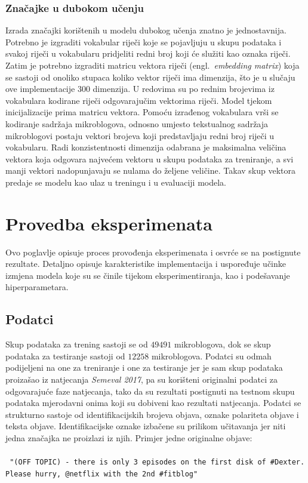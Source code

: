 \documentclass[times, utf8, zavrsni]{fer}
\begin{document}
\subsection{Značajke u dubokom učenju}

Izrada značajki korištenih u modelu dubokog učenja znatno je jednostavnija. Potrebno je izgraditi vokabular riječi koje se pojavljuju u skupu podataka i svakoj riječi u vokabularu pridjeliti redni broj koji će služiti kao oznaka riječi. Zatim je potrebno izgraditi matricu vektora riječi (engl.~\emph{embedding matrix}) koja se sastoji od onoliko stupaca koliko vektor riječi ima dimenzija, što je u slučaju ove implementacije 300 dimenzija. U redovima su po rednim brojevima iz vokabulara kodirane riječi odgovarajučim vektorima riječi. Model tjekom inicijalizacije prima matricu vektora. Pomoću izrađenog vokabulara vrši se kodiranje sadržaja mikroblogova, odnosno umjesto tekstualnog sadržaja mikroblogovi postaju vektori brojeva koji predstavljaju redni broj riječi u vokabularu. Radi konzistentnosti dimenzija odabrana je maksimalna veličina vektora koja odgovara najvećem vektoru u skupu podataka za treniranje, a svi manji vektori nadopunjavaju se nulama do željene veličine. Takav skup vektora predaje se modelu kao ulaz u treningu i u evaluaciji modela.

\chapter{Provedba eksperimenata}

Ovo poglavlje opisuje proces provođenja eksperimenata i osvrće se na postignute rezultate. Detaljno opisuje karakteristike implementacija i uspoređuje učinke izmjena modela koje su se činile tijekom eksperimentiranja, kao i podešavanje hiperparametara.

\section{Podatci}

Skup podataka za trening sastoji se od $49491$ mikroblogova, dok se skup podataka za testiranje sastoji od $12258$ mikroblogova. Podatci su odmah podijeljeni na one za treniranje i one za testiranje jer je sam skup podataka proizašao iz natjecanja \emph{Semeval 2017}, pa su korišteni originalni podatci za odgovarajuće faze natjecanja, tako da su rezultati postignuti na testnom skupu podataka mjerodavni onima koji su dobiveni kao rezultati natjecanja. Podatci se strukturno sastoje od identifikacijskih brojeva objava, oznake polariteta objave i teksta objave. Identifikacijske oznake izbačene su prilikom učitavanja jer niti jedna značajka ne proizlazi iz njih. 
Primjer jedne originalne objave:\\\\
\texttt{
\footnotesize{"(OFF TOPIC) - there is only 3 episodes on the first disk of \#Dexter. Please hurry, @netflix with the 2nd \#fitblog" }
}\\
\end{document}

